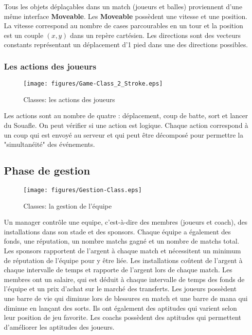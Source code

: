 Tous les objets déplaçables dans un match (joueurs et balles) proviennent d'une 
même interface \textbf{Moveable}. Les \textbf{Moveable} possèdent une vitesse 
et une position. La vitesse correspond au nombre de cases parcourables en un tour 
et la position est un couple $(x,y)$ dans un repère cartésien. Les directions sont des vecteurs constants représentant un déplacement d'1 pied dans une des directions possibles.

\subsubsection{Les actions des joueurs}
\begin{figure}[h!]
  \centering
  \texttt{[image: figures/Game-Class\_2\_Stroke.eps]}
  \caption{\label{fig:Class:Stroke} Classes: les actions des joueurs}
\end{figure}

Les actions sont au nombre de quatre : déplacement, coup de batte, sort et lancer 
du Souafle. On peut vérifier si une action est logique. Chaque action correspond 
à un coup qui est envoyé au \gls{serveur} et qui peut être décomposé pour permettre la 
"simultanéité" des événements.

\subsection{Phase de gestion}
\begin{sidewaysfigure}
  \centering
  \texttt{[image: figures/Gestion-Class.eps]}
  \caption{\label{fig:Class:Management} Classes: la gestion de l'équipe}
\end{sidewaysfigure}

Un \gls{manager} contrôle une \gls{equipe}, c'est-à-dire des \gls{membre}s 
(\gls{joueur}s et 
\gls{coach}), des \gls{installation}s dans son \gls{stade} et des 
\gls{sponsor}s. Chaque équipe a également des 
fonds, une réputation, un nombre matchs gagné et un nombre de matchs total.
Les sponsors rapportent de l'argent à chaque match et nécessitent un minimum 
de réputation de l'équipe pour y être liée. Les installations coûtent 
de l'argent à chaque intervalle de temps et rapporte de l'argent lors de 
chaque match.
Les membres ont un salaire, qui est déduit à chaque intervalle de temps des 
fonds de l'équipe et un prix d'achat sur le marché des transferts.
Les joueurs possèdent une barre de vie qui diminue lors de blessures en match 
et une barre de mana qui diminue en lançant des sorts. Ils ont également des 
aptitudes qui varient selon leur position de jeu favorite.
Les coachs possèdent des aptitudes qui permettent d'améliorer les aptitudes 
des joueurs.

